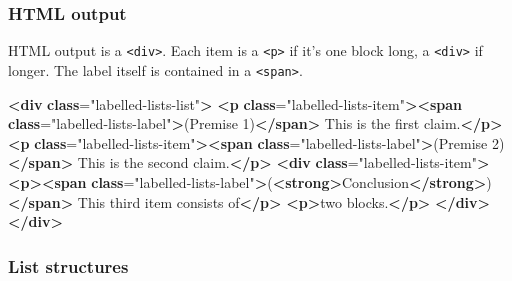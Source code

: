 \documentclass[
]{article}
\newenvironment{Shaded}{}{}
\newcommand{\ErrorTok}[1]{\textcolor[rgb]{1.00,0.00,0.00}{\textbf{#1}}}
\newcommand{\KeywordTok}[1]{\textcolor[rgb]{0.00,0.44,0.13}{\textbf{#1}}}
\newcommand{\NormalTok}[1]{#1}
\newcommand{\OtherTok}[1]{\textcolor[rgb]{0.00,0.44,0.13}{#1}}
\newcommand{\StringTok}[1]{\textcolor[rgb]{0.25,0.44,0.63}{#1}}
\begin{document}
\hypertarget{html-output}{%
\subsubsection{HTML output}\label{html-output}}

HTML output is a \texttt{\textless{}div\textgreater{}}. Each item is a
\texttt{\textless{}p\textgreater{}} if it's one block long, a
\texttt{\textless{}div\textgreater{}} if longer. The label itself is
contained in a \texttt{\textless{}span\textgreater{}}.

\begin{Shaded}
\begin{Highlighting}[]
\KeywordTok{\textless{}div} \ErrorTok{class}\OtherTok{=}\StringTok{"labelled{-}lists{-}list"}\KeywordTok{\textgreater{}}
  \KeywordTok{\textless{}p} \ErrorTok{class}\OtherTok{=}\StringTok{"labelled{-}lists{-}item"}\KeywordTok{\textgreater{}\textless{}span} \ErrorTok{class}\OtherTok{=}\StringTok{"labelled{-}lists{-}label"}\KeywordTok{\textgreater{}}\NormalTok{(Premise 1)}\KeywordTok{\textless{}/span\textgreater{}}\NormalTok{ This is the first claim.}\KeywordTok{\textless{}/p\textgreater{}}
  \KeywordTok{\textless{}p} \ErrorTok{class}\OtherTok{=}\StringTok{"labelled{-}lists{-}item"}\KeywordTok{\textgreater{}\textless{}span} \ErrorTok{class}\OtherTok{=}\StringTok{"labelled{-}lists{-}label"}\KeywordTok{\textgreater{}}\NormalTok{(Premise 2)}\KeywordTok{\textless{}/span\textgreater{}}\NormalTok{ This is the second claim.}\KeywordTok{\textless{}/p\textgreater{}}
  \KeywordTok{\textless{}div} \ErrorTok{class}\OtherTok{=}\StringTok{"labelled{-}lists{-}item"}\KeywordTok{\textgreater{}}
    \KeywordTok{\textless{}p\textgreater{}\textless{}span} \ErrorTok{class}\OtherTok{=}\StringTok{"labelled{-}lists{-}label"}\KeywordTok{\textgreater{}}\NormalTok{(}\KeywordTok{\textless{}strong\textgreater{}}\NormalTok{Conclusion}\KeywordTok{\textless{}/strong\textgreater{}}\NormalTok{)}\KeywordTok{\textless{}/span\textgreater{}}\NormalTok{ This third item consists of}\KeywordTok{\textless{}/p\textgreater{}}
    \KeywordTok{\textless{}p\textgreater{}}\NormalTok{two blocks.}\KeywordTok{\textless{}/p\textgreater{}}
  \KeywordTok{\textless{}/div\textgreater{}}
\KeywordTok{\textless{}/div\textgreater{}}
\end{Highlighting}
\end{Shaded}

\hypertarget{list-structures}{%
\subsubsection{List structures}\label{list-structures}}
\end{document}
